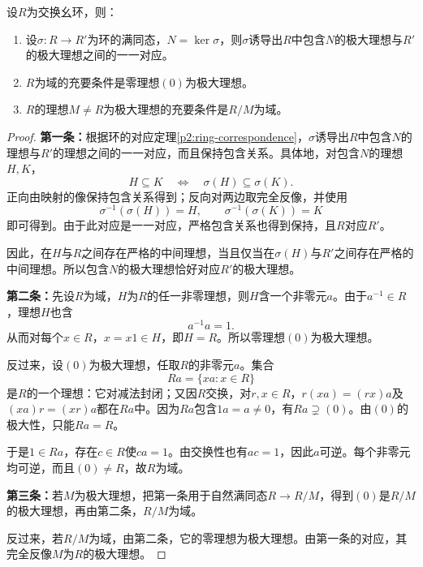 \begin{theorem}\label{p2:prime-maximal}
设$R$为交换幺环，则：
\begin{enumerate}
\item 设$\sigma:R\to R'$为环的满同态，$N=\ker\sigma$，则$\sigma$诱导出$R$中包含$N$的极大理想与$R'$的极大理想之间的一一对应。
\item $R$为域的充要条件是零理想$(0)$为极大理想。
\item $R$的理想$M\ne R$为极大理想的充要条件是$R/M$为域。
\end{enumerate}
\end{theorem}
\begin{proof}
\textbf{第一条：}根据环的对应定理\ref{p2:ring-correspondence}，$\sigma$诱导出$R$中包含$N$的理想与$R'$的理想之间的一一对应，而且保持包含关系。具体地，对包含$N$的理想$H,K$，
\[
H\subseteq K\quad\Longleftrightarrow\quad\sigma(H)\subseteq\sigma(K).
\]
正向由映射的像保持包含关系得到；反向对两边取完全反像，并使用
\[
\sigma^{-1}(\sigma(H))=H,\qquad
\sigma^{-1}(\sigma(K))=K
\]
即可得到。由于此对应是一一对应，严格包含关系也得到保持，且$R$对应$R'$。

因此，在$H$与$R$之间存在严格的中间理想，当且仅当在$\sigma(H)$与$R'$之间存在严格的中间理想。所以包含$N$的极大理想恰好对应$R'$的极大理想。

\textbf{第二条：}先设$R$为域，$H$为$R$的任一非零理想，则$H$含一个非零元$a$。由于$a^{-1}\in R$，理想$H$也含
\[
a^{-1}a=1.
\]
从而对每个$x\in R$，$x=x1\in H$，即$H=R$。所以零理想$(0)$为极大理想。

反过来，设$(0)$为极大理想，任取$R$的非零元$a$。集合
\[
Ra=\{xa:x\in R\}
\]
是$R$的一个理想：它对减法封闭；又因$R$交换，对$r,x\in R$，$r(xa)=(rx)a$及$(xa)r=(xr)a$都在$Ra$中。因为$Ra$包含$1a=a\ne0$，有$Ra\supsetneq(0)$。由$(0)$的极大性，只能$Ra=R$。

于是$1\in Ra$，存在$c\in R$使$ca=1$。由交换性也有$ac=1$，因此$a$可逆。每个非零元均可逆，而且$(0)\ne R$，故$R$为域。

\textbf{第三条：}若$M$为极大理想，把第一条用于自然满同态$R\to R/M$，得到$(0)$是$R/M$的极大理想，再由第二条，$R/M$为域。

反过来，若$R/M$为域，由第二条，它的零理想为极大理想。由第一条的对应，其完全反像$M$为$R$的极大理想。
\end{proof}

